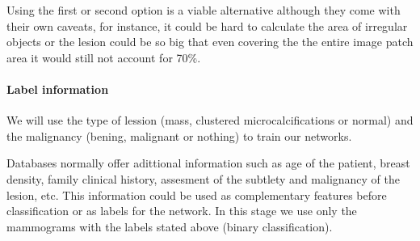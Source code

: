 Using the first or second option is a viable alternative although they come with their own caveats, for instance, it could be hard to calculate the area of irregular objects or the lesion could be so big that even covering the the entire image patch area it would still not account for 70\%.

\paragraph{Label information}
We will use the type of lession (mass, clustered microcalcifications or normal) and the malignancy (bening, malignant or nothing) to train our networks.

Databases normally offer adittional information such as age of the patient, breast density, family clinical history, assesment of the subtlety and malignancy of the lesion, etc. This information could be used as complementary features before classification or as labels for the network. In this stage we use only the mammograms with the labels stated above (binary classification).


